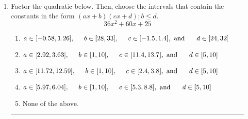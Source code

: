 \documentclass[14pt]{extbook}
\newcommand{\litem}[1]{\item#1\hspace*{-1cm}\rule{\textwidth}{0.4pt}}
\begin{document}
\begin{enumerate}
{\begin{enumerate}[label=\Alph*.]
\end{enumerate} }
\litem{
Factor the quadratic below. Then, choose the intervals that contain the constants in the form $(ax+b)(cx+d); b \leq d.$\[ 36x^{2} +60 x + 25 \]\begin{enumerate}[label=\Alph*.]
\item \( a \in [-0.58, 1.26], \hspace*{5mm} b \in [28, 33], \hspace*{5mm} c \in [-1.5, 1.4], \text{ and } \hspace*{5mm} d \in [24, 32] \)
\item \( a \in [2.92, 3.63], \hspace*{5mm} b \in [1, 10], \hspace*{5mm} c \in [11.4, 13.7], \text{ and } \hspace*{5mm} d \in [5, 10] \)
\item \( a \in [11.72, 12.59], \hspace*{5mm} b \in [1, 10], \hspace*{5mm} c \in [2.4, 3.8], \text{ and } \hspace*{5mm} d \in [5, 10] \)
\item \( a \in [5.97, 6.04], \hspace*{5mm} b \in [1, 10], \hspace*{5mm} c \in [5.3, 8.8], \text{ and } \hspace*{5mm} d \in [5, 10] \)
\item \( \text{None of the above.} \)

\end{enumerate} }
\end{enumerate}
\end{document}
